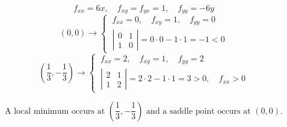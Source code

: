 \documentclass[a4paper, 12pt]{article}
\begin{document}
\begin{enumerate}[leftmargin=*,label=\textbf{\arabic*.}]
\[f_{xx}=6x,\quad f_{xy}=f_{yx}=1,\quad f_{yy}=-6y\]
\[(0,0)\rightarrow\left\{\:\begin{array}{l}
f_{xx}=0,\quad f_{xy}=1,\quad f_{yy}=0\\[1em]
\left|\begin{array}{cc}
0 & 1\\
1 & 0
\end{array}\right|=0\cdot0-1\cdot1=-1<0
\end{array}\right.\]
\[\left(\frac13,-\frac13\right)\rightarrow\left\{\:\begin{array}{l}
f_{xx}=2,\quad f_{xy}=1,\quad f_{yy}=2\\[1em]
\left|\begin{array}{cc}
2 & 1\\
1 & 2
\end{array}\right|=2\cdot2-1\cdot1=3>0,\quad f_{xx}>0
\end{array}\right.\]

\[\boxed{\text{A local minimum occurs at }\left(\frac13,-\frac13\right)\text{ and a saddle point occurs at }(0,0).}\]
\end{enumerate}
\end{document}
